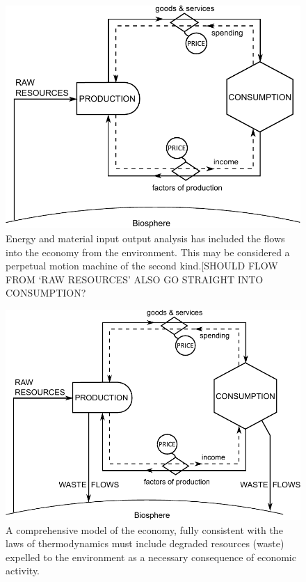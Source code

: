 \begin{figure}[!ht]
\centering{}
\includegraphics[width=\linewidth]{Part_0/Chapter_Introduction/images/Perpetual_motion_2.pdf}
\caption[The traditional model supplemented with resource inputs]{Energy and material input output analysis has included the flows into the economy from the environment. This may be considered a perpetual motion machine of the second kind.[SHOULD FLOW FROM `RAW RESOURCES' ALSO GO STRAIGHT INTO CONSUMPTION?}
\end{figure}

\begin{figure}[!ht]
\centering{}
\includegraphics[width=\linewidth]{Part_0/Chapter_Introduction/images/PERKS.pdf}
\caption[A comprehensive biophysical (?) model of the economy]{A comprehensive model of the economy, fully consistent with the laws of thermodynamics must include degraded resources (waste) expelled to the environment as a necessary consequence of economic activity.}
\end{figure}

